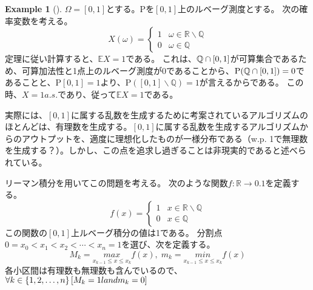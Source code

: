 \documentclass{ltjsarticle}
\numberwithin{equation}{subsection}
\theoremstyle{definition}
\newtheorem{ex}[dfn]{Example}
\begin{document}
\begin{ex}[]
    $\Omega=[0,1]$とする。$\mathrm{P}$を$[0,1]$上のルベーグ測度とする。
    次の確率変数を考える。
    \begin{equation}
        X(\omega) = 
        \begin{cases}
            1 & \omega \in \mathbb{R} \backslash \mathbb{Q} \\
            0 & \omega \in \mathbb{Q}
        \end{cases}
    \end{equation}
    定理に従い計算すると、$\mathbb{E}X=1$である。
    これは、$\mathbb{Q}\cap \qty[0,1]$が可算集合であるため、可算加法性と1点上のルベーグ測度が0であることから、$\mathrm{P} (\mathbb{Q} \cap \qty[0,1])=0$であることと、$\mathrm{P}[0,1]=1$より、$\mathrm{P}([0,1] \backslash \mathbb{Q})=1$が言えるからである。
    この時、$X=1 a.s.$であり、従って$\mathbb{E}X=1$である。


    実際には、$[0,1]$に属する乱数を生成するために考案されているアルゴリズムのほとんどは、有理数を生成する。$[0,1]$に属する乱数を生成するアルゴリズムからのアウトプットを、適度に理想化したものが一様分布である（w.p. 1で無理数を生成する？）。しかし、この点を追求し過ぎることは非現実的であると述べられている。


    リーマン積分を用いてこの問題を考える。
    次のような関数$f: \mathbb{R} \to \qty{0,1}$を定義する。
    \begin{equation}
        f(x) = 
        \begin{cases}
            1 & x \in \mathbb{R} \backslash \mathbb{Q} \\
            0 & x \in \mathbb{Q}
        \end{cases}
    \end{equation}
    この関数の$[0,1]$上ルベーグ積分の値は1である。
    分割点$0=x_0 < x_1 < x_2 < \cdots < x_n = 1$を選び、次を定義する。
    \begin{equation}
        M_k = \underset{x_{k-1} \leq x \leq x_{k}}{max} f(x), \; m_k=\underset{x_{k-1} \leq x \leq x_{k}}{min} f(x)
    \end{equation}
    各小区間は有理数も無理数も含んでいるので、$\forall k \in \qty{1,2,\dots,n}[M_k=1 land m_k=0]$
\end{ex}


% 
% 
\end{document}
